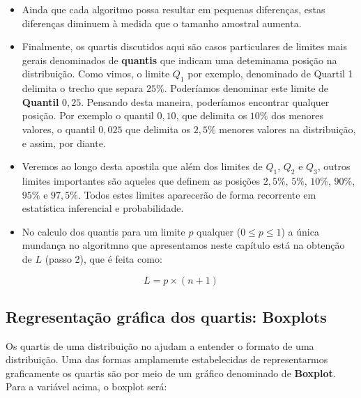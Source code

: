 \documentclass[
]{book}
\begin{document}
\begin{itemize}
\item
  Ainda que cada algoritmo possa resultar em pequenas diferenças, estas diferenças diminuem à medida que o tamanho amostral aumenta.
\item
  Finalmente, os quartis discutidos aqui são casos particulares de limites mais gerais denominados de \textbf{quantis} que indicam uma deteminama posição na distribuição. Como vimos, o limite \(Q_1\) por exemplo, denominado de Quartil 1 delimita o trecho que separa \(25\%\). Poderíamos denominar este limite de \textbf{Quantil} \(0,25\). Pensando desta maneira, poderíamos encontrar qualquer posição. Por exemplo o quantil \(0,10\), que delimita os \(10\%\) dos menores valores, o quantil \(0,025\) que delimita os \(2,5\%\) menores valores na distribuição, e assim, por diante.
\item
  Veremos ao longo desta apostila que além dos limites de \(Q_1\), \(Q_2\) e \(Q_3\), outros limites importantes são aqueles que definem as posições \(2,5\%\), \(5\%\), \(10\%\), \(90\%\), \(95\%\) e \(97,5\%\). Todos estes limites aparecerão de forma recorrente em estatística inferencial e probabilidade.
\item
  No calculo dos quantis para um limite \(p\) qualquer (\(0 \le p \le 1\)) a única mundança no algoritmno que apresentamos neste capítulo está na obtenção de \(L\) (passo 2), que é feita como:
\end{itemize}

\[L = p \times (n+1)\]

\hypertarget{regresentauxe7uxe3o-gruxe1fica-dos-quartis-boxplots}{%
\subsection{Regresentação gráfica dos quartis: Boxplots}\label{regresentauxe7uxe3o-gruxe1fica-dos-quartis-boxplots}}

Os quartis de uma distribuição no ajudam a entender o formato de uma distribuição. Uma das formas amplamemte estabelecidas de representarmos graficamente os quartis são por meio de um gráfico denominado de \textbf{Boxplot}. Para a variável acima, o boxplot será:
\end{document}
